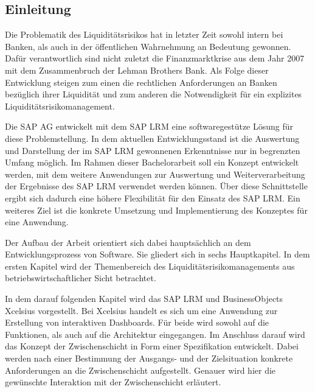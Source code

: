 \begin{onehalfspacing}

\chapter{Einleitung}

Die Problematik des Liquiditätsrisikos hat in letzter Zeit sowohl intern bei Banken, als auch in der öffentlichen Wahrnehmung an Bedeutung gewonnen. Dafür verantwortlich sind nicht zuletzt die Finanzmarktkrise aus dem Jahr 2007 mit dem Zusammenbruch der Lehman Brothers Bank. Als Folge dieser Entwicklung steigen zum einen die rechtlichen Anforderungen an Banken bezüglich ihrer Liquidität und zum anderen die Notwendigkeit für ein explizites Liquiditätsrisikomanagement. 

Die SAP AG entwickelt mit dem SAP LRM eine softwaregestütze Lösung für diese Problemstellung. In dem aktuellen Entwicklungsstand ist die Auswertung und Darstellung der im SAP LRM gewonnenen Erkenntnisse nur in begrenzten Umfang möglich. Im Rahmen dieser Bachelorarbeit soll ein Konzept entwickelt werden, mit dem weitere Anwendungen zur Auswertung und Weiterverarbeitung der Ergebnisse des SAP LRM verwendet werden können. Über diese Schnittstelle ergibt sich dadurch eine höhere Flexibilität für den Einsatz des SAP LRM. Ein weiteres Ziel ist die konkrete Umsetzung und Implementierung des Konzeptes für eine Anwendung.

Der Aufbau der Arbeit orientiert sich dabei hauptsächlich an dem Entwicklungsprozess von Software. Sie gliedert sich in sechs Hauptkapitel. In dem ersten Kapitel wird der Themenbereich des Liquiditätsrisikomanagements aus betriebswirtschaftlicher Sicht betrachtet.

In dem darauf folgenden Kapitel wird das SAP LRM und BusinessObjects Xcelsius vorgestellt. Bei Xcelsius handelt es sich um eine Anwendung zur Erstellung von interaktiven Dashboards. Für beide wird sowohl auf die Funktionen, als auch auf die Architektur eingegangen.
Im Anschluss darauf wird das Konzept der Zwischenschicht in Form einer Spezifikation entwickelt. Dabei werden nach einer Bestimmung der Ausgangs- und der Zielsituation konkrete Anforderungen an die Zwischenschicht aufgestellt. Genauer wird hier die gewünschte Interaktion mit der Zwischenschicht erläutert.


\end{onehalfspacing}
